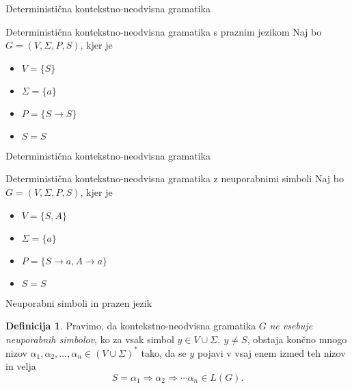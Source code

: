 \documentclass{beamer}
\theoremstyle{definition} %
\newtheorem{definicija}{Definicija}[section]
\begin{document}
\begin{frame}{Deterministična kontekstno-neodvisna gramatika}
    \begin{exampleblock}{Deterministična kontekstno-neodvisna gramatika s praznim jezikom}
        Naj bo $ G = ( V, \Sigma, P, S ) $, kjer je 
        \begin{itemize}
            \item<2-> $ V = \{ S \} $
            \item<3-> $ \Sigma = \{ a \} $
            \item<4-> $P = \{ S \rightarrow S \} $
            \item<5-> $ S = S $
        \end{itemize}
        \pause
    \end{exampleblock}
\end{frame}

\begin{frame}{Deterministična kontekstno-neodvisna gramatika}
    \begin{exampleblock}{Deterministična kontekstno-neodvisna gramatika z neuporabnimi simboli}
        Naj bo $ G = ( V, \Sigma, P, S ) $, kjer je 
        \begin{itemize}
            \item $ V = \{ S, A \} $
            \item $ \Sigma = \{ a \} $
            \item $P = \{ S \rightarrow a, A \rightarrow a \} $
            \item $ S = S $
        \end{itemize}
        \pause
    \end{exampleblock}
\end{frame}

\begin{frame}{Neuporabni simboli in prazen jezik}
    \begin{definicija}
        Pravimo, da kontekstno-neodvisna gramatika $G$ \textit{ne vsebuje neuporabnih simbolov}, ko za vsak simbol
        $ y \in V \cup \Sigma, \ y \neq S $, obstaja končno mnogo nizov $ \alpha_1, \alpha_2, \ldots, \alpha_n \in 
        (V \cup \Sigma)^* $ tako, da se $y$ pojavi v vsaj enem izmed teh nizov in velja
        \[
            S = \alpha_1 \Rightarrow \alpha_2 \Rightarrow \cdots \alpha_n \in L(G).
        \] 
    \end{definicija}
\end{frame}
\end{document}
